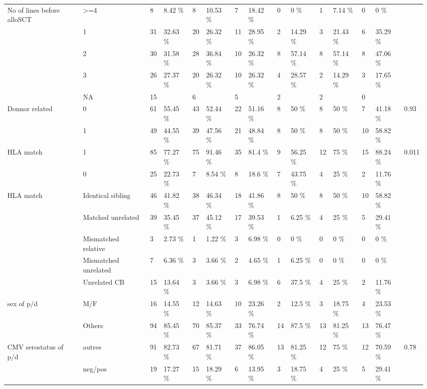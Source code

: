 \documentclass[a4paper,11pt] {article}
\begin{document}
\begin{landscape}
\begin{longtable}{lllllllllllllll}
  No of lines before alloSCT & >=4 & 8 & 8.42 \% & 8 & 10.53 \% & 7 & 18.42 \% & 0 & 0 \% & 1 & 7.14 \% & 0 & 0 \% &  \\ 
   & 1 & 31 & 32.63 \% & 20 & 26.32 \% & 11 & 28.95 \% & 2 & 14.29 \% & 3 & 21.43 \% & 6 & 35.29 \% &  \\ 
   & 2 & 30 & 31.58 \% & 28 & 36.84 \% & 10 & 26.32 \% & 8 & 57.14 \% & 8 & 57.14 \% & 8 & 47.06 \% &  \\ 
   & 3 & 26 & 27.37 \% & 20 & 26.32 \% & 10 & 26.32 \% & 4 & 28.57 \% & 2 & 14.29 \% & 3 & 17.65 \% &  \\ 
   & NA & 15 &  & 6 &  & 5 &  & 2 &  & 2 &  & 0 &  &  \\ 
  Donnor related & 0 & 61 & 55.45 \% & 43 & 52.44 \% & 22 & 51.16 \% & 8 & 50 \% & 8 & 50 \% & 7 & 41.18 \% & 0.93 \\ 
   & 1 & 49 & 44.55 \% & 39 & 47.56 \% & 21 & 48.84 \% & 8 & 50 \% & 8 & 50 \% & 10 & 58.82 \% &  \\ 
  HLA match & 1 & 85 & 77.27 \% & 75 & 91.46 \% & 35 & 81.4 \% & 9 & 56.25 \% & 12 & 75 \% & 15 & 88.24 \% & 0.011 \\ 
   & 0 & 25 & 22.73 \% & 7 & 8.54 \% & 8 & 18.6 \% & 7 & 43.75 \% & 4 & 25 \% & 2 & 11.76 \% &  \\ 
  HLA match & Identical sibling & 46 & 41.82 \% & 38 & 46.34 \% & 18 & 41.86 \% & 8 & 50 \% & 8 & 50 \% & 10 & 58.82 \% &  \\ 
   & Matched unrelated & 39 & 35.45 \% & 37 & 45.12 \% & 17 & 39.53 \% & 1 & 6.25 \% & 4 & 25 \% & 5 & 29.41 \% &  \\ 
   & Mismatched relative & 3 & 2.73 \% & 1 & 1.22 \% & 3 & 6.98 \% & 0 & 0 \% & 0 & 0 \% & 0 & 0 \% &  \\ 
   & Mismatched unrelated & 7 & 6.36 \% & 3 & 3.66 \% & 2 & 4.65 \% & 1 & 6.25 \% & 0 & 0 \% & 0 & 0 \% &  \\ 
   & Unrelated CB & 15 & 13.64 \% & 3 & 3.66 \% & 3 & 6.98 \% & 6 & 37.5 \% & 4 & 25 \% & 2 & 11.76 \% &  \\ 
  sex of p/d & M/F & 16 & 14.55 \% & 12 & 14.63 \% & 10 & 23.26 \% & 2 & 12.5 \% & 3 & 18.75 \% & 4 & 23.53 \% &  \\ 
   & Others & 94 & 85.45 \% & 70 & 85.37 \% & 33 & 76.74 \% & 14 & 87.5 \% & 13 & 81.25 \% & 13 & 76.47 \% &  \\ 
  CMV serostatus of p/d & autres & 91 & 82.73 \% & 67 & 81.71 \% & 37 & 86.05 \% & 13 & 81.25 \% & 12 & 75 \% & 12 & 70.59 \% & 0.78 \\ 
   & neg/pos & 19 & 17.27 \% & 15 & 18.29 \% & 6 & 13.95 \% & 3 & 18.75 \% & 4 & 25 \% & 5 & 29.41 \% &  \\ 

\end{longtable}
\end{landscape}
\end{document}
